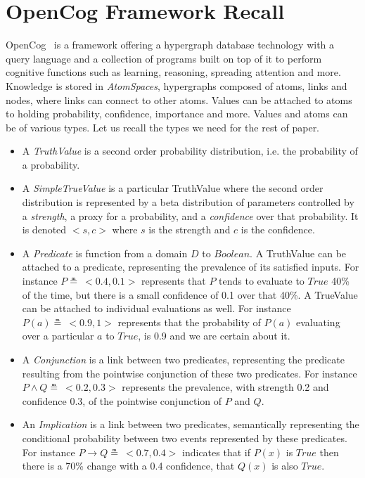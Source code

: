 \documentclass[runningheads]{llncs}
\newcommand{\TTrue}{\textit{True}}
\newcommand{\limp}{\rightarrow}
\begin{document}

\section{OpenCog Framework Recall}
\label{sec:opencog}
OpenCog~\cite{Hart2008} is a framework offering a hypergraph database
technology with a query language and a collection of programs built on
top of it to perform cognitive functions such as learning, reasoning,
spreading attention and more.  Knowledge is stored in
\emph{AtomSpaces}, hypergraphs composed of atoms, links and nodes,
where links can connect to other atoms.  Values can be attached to
atoms to holding probability, confidence, importance and more.  Values
and atoms can be of various types.  Let us recall the types we need
for the rest of paper.
\begin{itemize}
\item A \emph{TruthValue} is a second order probability distribution,
  i.e. the probability of a probability.
\item A \emph{SimpleTrueValue} is a particular TruthValue where the
  second order distribution is represented by a beta distribution of
  parameters controlled by a \emph{strength}, a proxy for a
  probability, and a \emph{confidence} over that probability.  It is
  denoted $<s, c>$ where $s$ is the strength and $c$ is the
  confidence.
\item A \emph{Predicate} is function from a domain $D$ to $Boolean$.
  A TruthValue can be attached to a predicate, representing the
  prevalence of its satisfied inputs.  For instance
  $P \measeq\ <\!0.4, 0.1\!>$ represents that $P$ tends to evaluate to
  $\TTrue$ 40\% of the time, but there is a small confidence of
  0.1 over that 40\%.  A TrueValue can be attached to individual
  evaluations as well.  For instance $P(a) \measeq\ <\!0.9, 1\!>$
  represents that the probability of $P(a)$ evaluating over a
  particular $a$ to $\TTrue$, is 0.9 and we are certain about
  it.
\item A \emph{Conjunction} is a link between two predicates,
  representing the predicate resulting from the pointwise conjunction
  of these two predicates.  For instance
  $P \land Q \measeq\ <\!0.2, 0.3\!>$ represents the prevalence, with
  strength 0.2 and confidence 0.3, of the pointwise conjunction of $P$
  and $Q$.
\item An \emph{Implication} is a link between two predicates,
  semantically representing the conditional probability between two
  events represented by these predicates.  For instance
  $P \limp Q \measeq\ <\!0.7, 0.4\!>$ indicates that if $P(x)$ is
  $\TTrue$ then there is a 70\% change with a 0.4 confidence,
  that $Q(x)$ is also $\TTrue$.
\end{itemize}
\end{document}
